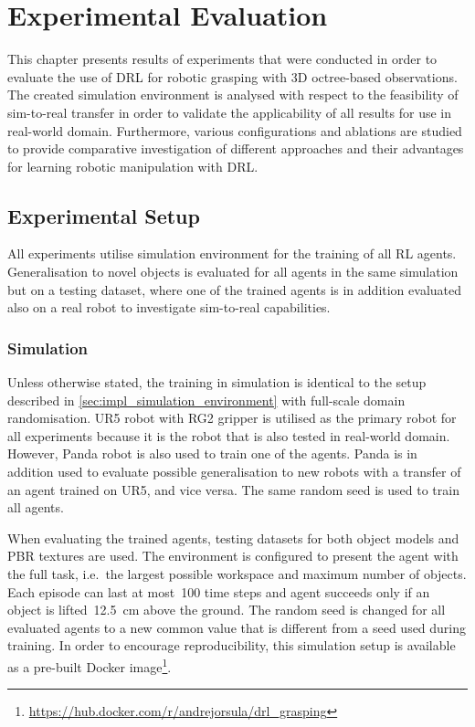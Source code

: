 \chapter{Experimental Evaluation}\label{ch:experimental_evaluation}

This chapter presents results of experiments that were conducted in order to evaluate the use of DRL for robotic grasping with 3D octree-based observations. The created simulation environment is analysed with respect to the feasibility of sim-to-real transfer in order to validate the applicability of all results for use in real-world domain. Furthermore, various configurations and ablations are studied to provide comparative investigation of different approaches and their advantages for learning robotic manipulation with DRL.


\section{Experimental Setup}

All experiments utilise simulation environment for the training of all RL agents. Generalisation to novel objects is evaluated for all agents in the same simulation but on a testing dataset, where one of the trained agents is in addition evaluated also on a real robot to investigate sim-to-real capabilities.


\subsection{Simulation}

Unless otherwise stated, the training in simulation is identical to the setup described in \autoref{sec:impl_simulation_environment} with full-scale domain randomisation. UR5 robot with RG2 gripper is utilised as the primary robot for all experiments because it is the robot that is also tested in real-world domain. However,  Panda robot is also used to train one of the agents. Panda is in addition used to evaluate possible generalisation to new robots with a transfer of an agent trained on UR5, and vice versa. The same random seed is used to train all agents.

When evaluating the trained agents, testing datasets for both object models and PBR textures are used. The environment is configured to present the agent with the full task, i.e.~the largest possible workspace and maximum number of objects. Each episode can last at most~100 time steps and agent succeeds only if an object is lifted~12.5~cm above the ground. The random seed is changed for all evaluated agents to a new common value that is different from a seed used during training. In order to encourage reproducibility, this simulation setup is available as a pre-built Docker image\footnote{\href{https://hub.docker.com/r/andrejorsula/drl_grasping}{https://hub.docker.com/r/andrejorsula/drl\_grasping}}.


